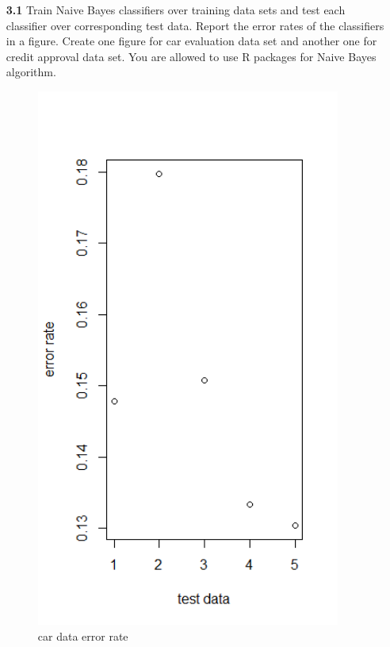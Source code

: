 \documentclass{article}
\begin{document}
\begin{enumerate}
\item[\textbf{3.1}] Train Naive Bayes classifiers over training data sets and test each classifier over corresponding  test data.  Report the error rates  of the classifiers  in a figure. Create one figure for car evaluation  data set and  another one for credit approval data set. You are allowed to use R packages for Naive Bayes algorithm.
\begin{figure}
  \includegraphics[width=100mm, scale = 0.5]{carError.png}
  \caption{car data error rate}
\end{figure}
\begin{figure}

\end{figure}
\end{enumerate}
\end{document}
